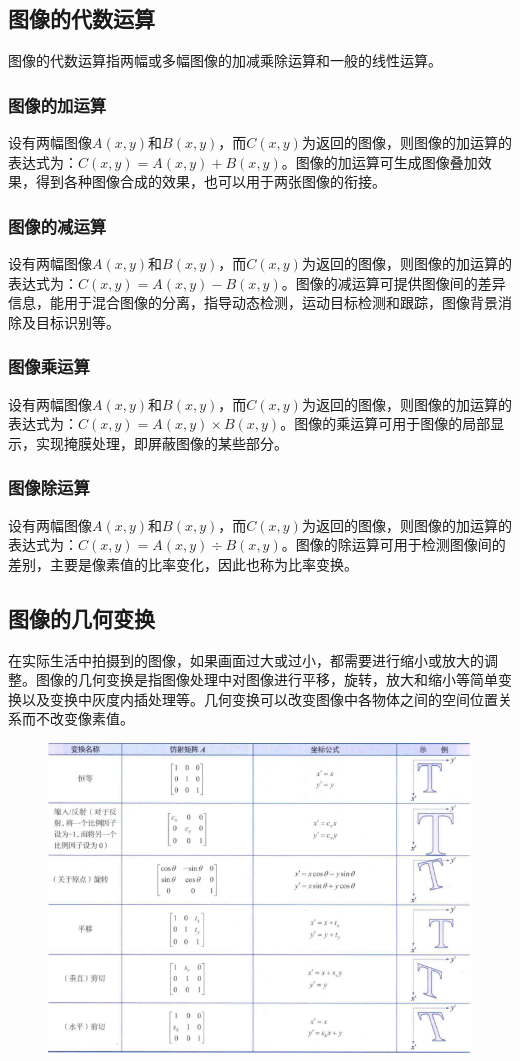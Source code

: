 \documentclass[11pt]{article}
\begin{document}
\subsection{图像的代数运算}
图像的代数运算指两幅或多幅图像的加减乘除运算和一般的线性运算。
\subsubsection{图像的加运算}
设有两幅图像$A(x,y)$和$B(x,y)$，而$C(x,y)$为返回的图像，则图像的加运算的表达式为：$C(x,y) = A(x,y) + B(x,y)$。图像的加运算可生成图像叠加效果，得到各种图像合成的效果，也可以用于两张图像的衔接。
\subsubsection{图像的减运算}
设有两幅图像$A(x,y)$和$B(x,y)$，而$C(x,y)$为返回的图像，则图像的加运算的表达式为：$C(x,y) = A(x,y) - B(x,y)$。图像的减运算可提供图像间的差异信息，能用于混合图像的分离，指导动态检测，运动目标检测和跟踪，图像背景消除及目标识别等。
\subsubsection{图像乘运算}
设有两幅图像$A(x,y)$和$B(x,y)$，而$C(x,y)$为返回的图像，则图像的加运算的表达式为：$C(x,y) = A(x,y) \times B(x,y)$。图像的乘运算可用于图像的局部显示，实现掩膜处理，即屏蔽图像的某些部分。
\subsubsection{图像除运算}
设有两幅图像$A(x,y)$和$B(x,y)$，而$C(x,y)$为返回的图像，则图像的加运算的表达式为：$C(x,y) = A(x,y) \div B(x,y)$。图像的除运算可用于检测图像间的差别，主要是像素值的比率变化，因此也称为比率变换。
\subsection{图像的几何变换}
在实际生活中拍摄到的图像，如果画面过大或过小，都需要进行缩小或放大的调整。图像的几何变换是指图像处理中对图像进行平移，旋转，放大和缩小等简单变换以及变换中灰度内插处理等。几何变换可以改变图像中各物体之间的空间位置关系而不改变像素值。
\begin{figure}[H]
	\centering
	\includegraphics[scale=0.6]{56}
\end{figure}
\end{document}
